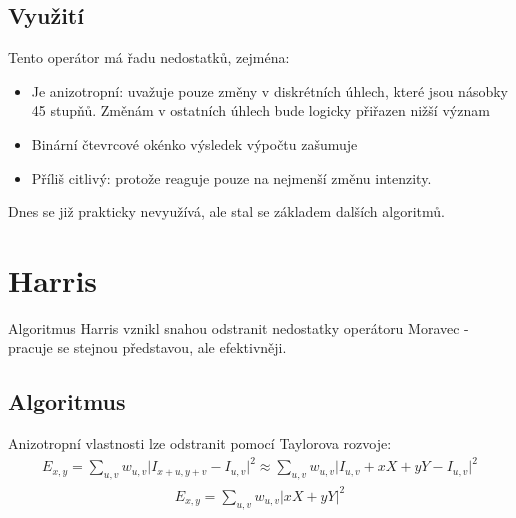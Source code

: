 \subsection{Využití}
Tento operátor má řadu nedostatků, zejména:
\begin{itemize}
	\item Je anizotropní: uvažuje pouze změny v diskrétních úhlech, které jsou násobky 45 stupňů. Změnám v ostatních úhlech bude logicky přiřazen nižší význam
	\item Binární čtevrcové okénko výsledek výpočtu zašumuje
	\item Příliš citlivý: protože reaguje pouze na nejmenší změnu intenzity.
\end{itemize}

Dnes se již prakticky nevyužívá, ale stal se základem dalších algoritmů.

\section{Harris}
		
Algoritmus Harris \cite{harris1988combined} vznikl snahou odstranit nedostatky operátoru Moravec - pracuje se stejnou představou, ale efektivněji.

\subsection{Algoritmus}	

Anizotropní vlastnosti lze odstranit pomocí Taylorova rozvoje:
\begin{align}	
E_{x,y} = \sum_{u,v} w_{u,v} \lvert I_{x+u, y+v} - I_{u,v} \rvert^2
\approx \sum_{u,v} w_{u,v} \lvert I_{u, v} + xX + yY  - I_{u,v} \rvert^2
\end{align}
\begin{align}
E_{x,y} = \sum_{u,v} w_{u,v} \lvert xX + yY \rvert^2
\end{align}

